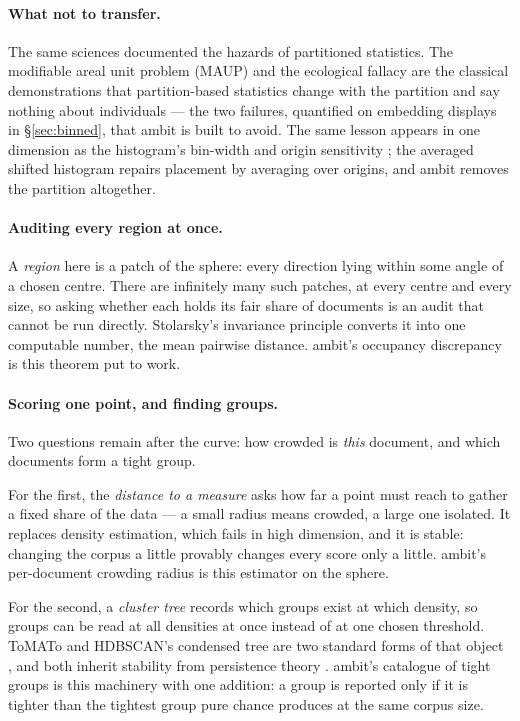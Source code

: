 \documentclass[11pt,letterpaper]{article}
\begin{document}
\paragraph{What not to transfer.}
The same sciences documented the hazards of partitioned statistics. The
modifiable areal unit problem (MAUP)
\cite{gehlke1934,openshaw1979,openshaw1984} and the ecological fallacy
\cite{robinson1950} are the classical demonstrations that
partition-based statistics change with the partition and say nothing
about individuals --- the two failures, quantified on embedding displays
in \S\ref{sec:binned}, that \textsf{ambit} is built to avoid. The same
lesson appears in one dimension as the histogram's bin-width and origin
sensitivity \cite{scott1979,freedman1981,silverman1986}; the averaged
shifted histogram \cite{scott1985} repairs placement by averaging over
origins, and \textsf{ambit} removes the partition altogether.

\paragraph{Auditing every region at once.}
A \emph{region} here is a patch of the sphere: every direction lying
within some angle of a chosen centre. There are infinitely many such
patches, at every centre and every size, so asking whether each holds
its fair share of documents is an audit that cannot be run directly.
Stolarsky's invariance principle \cite{stolarsky1973,brauchart2011}
converts it into one computable number, the mean pairwise distance.
\textsf{ambit}'s occupancy discrepancy is this theorem put to work.

\paragraph{Scoring one point, and finding groups.}
Two questions remain after the curve: how crowded is \emph{this}
document, and which documents form a tight group.

For the first, the \emph{distance to a measure}
\cite{chazal2011,chazalmichel2021} asks how far a point must reach to
gather a fixed share of the data --- a small radius means crowded, a
large one isolated. It replaces density estimation, which fails in high
dimension, and it is stable: changing the corpus a little provably
changes every score only a little. \textsf{ambit}'s per-document
crowding radius is this estimator on the sphere.

For the second, a \emph{cluster tree} \cite{hartigan1981,chaudhuri2010}
records which groups exist at which density, so groups can be read at
all densities at once instead of at one chosen threshold. ToMATo
\cite{chazal2013} and HDBSCAN's condensed tree \cite{campello2015} are
two standard forms of that object \cite{rolle2020}, and both inherit
stability from persistence theory \cite{cohensteiner2007}.
\textsf{ambit}'s catalogue of tight groups is this machinery with one
addition: a group is reported only if it is tighter than the tightest
group pure chance produces at the same corpus size.
\end{document}
